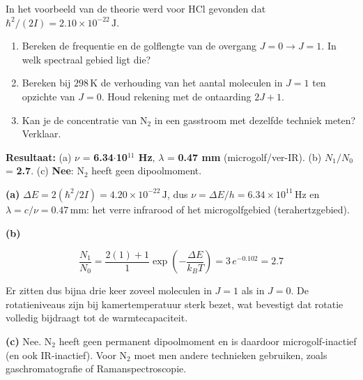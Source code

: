\begin{oefening}
In het voorbeeld van de theorie werd voor HCl gevonden dat \(\hbar^2/(2I) = 2.10\times10^{-22}\,\mathrm{J}\).

\begin{enumerate}
\item[(a)]
  Bereken de frequentie en de golflengte van de overgang \(J = 0 \to J = 1\). In welk spectraal gebied ligt die?
\item[(b)]
  Bereken bij \(298\,\mathrm{K}\) de verhouding van het aantal moleculen in \(J = 1\) ten opzichte van \(J = 0\). Houd rekening met de ontaarding \(2J + 1\).
\item[(c)]
  Kan je de concentratie van \(\mathrm{N_2}\) in een gasstroom met dezelfde techniek meten? Verklaar.
\end{enumerate}
\end{oefening}
\begin{oplossing}
\textbf{Resultaat:} (a) \(\nu\) = \textbf{6.34\ensuremath{\cdot{}}10\ensuremath{^{11}} Hz}, \(\lambda\) = \textbf{0.47 mm} (microgolf/ver-IR). (b) \(N_1/N_0\) = \textbf{2.7}. (c) \textbf{Nee}: N\ensuremath{_{2}} heeft geen dipoolmoment.

\textbf{(a)} \(\Delta E = 2(\hbar^2/2I) = 4.20\times10^{-22}\,\mathrm{J}\), dus \(\nu = \Delta E/h = 6.34\times10^{11}\,\mathrm{Hz}\) en \(\lambda = c/\nu = 0.47\,\mathrm{mm}\): het verre infrarood of het microgolfgebied (terahertzgebied).

\textbf{(b)}

\[
\frac{N_1}{N_0} = \frac{2(1)+1}{1}\exp\!\left(-\frac{\Delta E}{k_BT}\right) = 3\,e^{-0.102} = 2.7
\]

Er zitten dus bijna drie keer zoveel moleculen in \(J = 1\) als in \(J = 0\). De rotatieniveaus zijn bij kamertemperatuur sterk bezet, wat bevestigt dat rotatie volledig bijdraagt tot de warmtecapaciteit.

\textbf{(c)} Nee. \(\mathrm{N_2}\) heeft geen permanent dipoolmoment en is daardoor microgolf-inactief (en ook IR-inactief). Voor \(\mathrm{N_2}\) moet men andere technieken gebruiken, zoals gaschromatografie of Ramanspectroscopie.
\end{oplossing}

